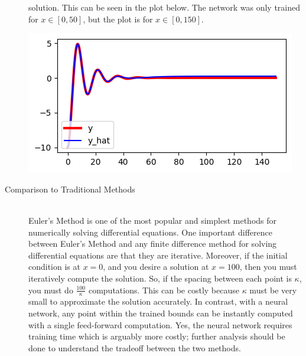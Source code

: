\documentclass[12pt]{article}
\begin{document}
\begin{description}
    solution. This can be seen in the plot below. The network was only trained
    for $x\in[0, 50]$, but the plot is for $x\in[0, 150]$. \\
    \begin{minipage}{\linewidth}
        \centering
        \includegraphics[scale=.5]{images/figure17.png}
    \end{minipage}
    \item[Comparison to Traditional Methods] \hfill \\
    Euler's Method is one of the most popular and simplest methods for
    numerically solving differential equations. One important difference
    between Euler's Method and any finite difference method for solving
    differential equations are that they are iterative. Moreover, if the
    initial condition is at $x=0$, and you desire a solution at $x=100$, then
    you must iteratively compute the solution. So, if the spacing between each
    point is $\kappa$, you must do $\frac{100}{\kappa}$ computations. This can be
    costly because $\kappa$ must be very small to approximate the solution
    accurately. In contrast, with a neural network, any point within the
    trained bounds can be instantly computed with a single feed-forward
    computation. Yes, the neural network requires training time which is
    arguably more costly; further analysis should be done to understand the
    tradeoff between the two methods.


\end{description}
\end{document}
